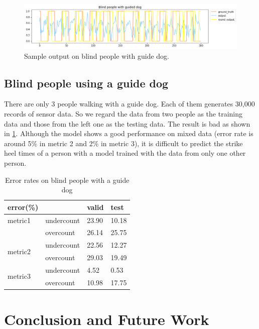 \documentclass[11pt]{article}
\begin{document}
\begin{figure}[ht]
\centering
\includegraphics[scale=0.5]{blind_gd}
\caption{Sample output on blind people with guide dog.}
\label{fig:blind_gd}
\end{figure}


\subsection{Blind people using a guide dog}

There are only 3 people walking with a guide dog. Each of them generates 30,000 records of sensor data. So we regard the data from two people as the training data and those from the left one as the testing data. The result is bad as shown in \ref{fig:blind_gd}. Although the model shows a  good performance on mixed data (error rate is around 5\% in metric 2 and 2\% in metric 3), it is difficult to predict the strike heel times of a person with a model trained with the data from only one other person.

\begin{table}[]
\centering
\caption{Error rates on blind people with a guide dog}
\label{my-label}
\begin{tabular}{llll}
\hline
error(\%)                &            & valid & test  \\ \hline
metric1                  & undercount & 23.90 & 10.18 \\
                         & overcount  & 26.14 & 25.75 \\ \hline
\multirow{2}{*}{metric2} & undercount & 22.56 & 12.27 \\
                         & overcount  & 29.03 & 19.49 \\ \hline
\multirow{2}{*}{metric3} & undercount & 4.52  & 0.53  \\
                         & overcount  & 10.98 & 17.75 \\ \hline
\end{tabular}
\end{table}


\section{Conclusion and Future Work}
\end{document}
